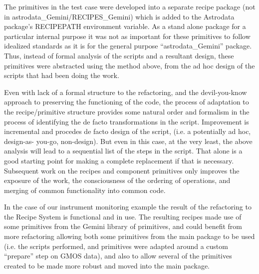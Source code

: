 \documentclass[letterpaper,10pt,english]{sphinxmanual}
\begin{document}
The primitives in the test case were developed into a separate recipe
package (not in astrodata\_Gemini/RECIPES\_Gemini) which is added to the
Astrodata package's RECIPEPATH environment variable. As a stand alone
package for a particular internal purpose it was not as important for
these primitives to follow idealized standards as it is for the
general purpose ``astrodata\_Gemini'' package. Thus, instead of formal
analysis of the scripts and a resultant design, these primitives were
abstracted using the method above, from the ad hoc design of the
scripts that had been doing the work.

Even with lack of a formal structure to the refactoring, and the
devil-you-know approach to preserving the functioning of the code, the
process of adaptation to the recipe/primitive structure provides some
natural order and formalism in the process of identifying the de facto
transformations in the script. Improvement is incremental and procedes
de facto design of the script, (i.e. a potentially ad hoc, design-as-
you-go, non-design). But even in this case, at the very least, the
above analysis will lead to a sequential list of the steps in the
script. That alone is a good starting point for making a complete
replacement if that is necessary. Subsequent work on the recipes and
component primitives only improves the exposure of the work, the
consciousness of the ordering of operations, and merging of common
functionality into common code.

In the case of our instrument monitoring example the result of the
refactoring to the Recipe System is functional and in use. The
resulting recipes made use of some primitives from the Gemini library
of primitives, and could benefit from more refactoring allowing both
some primitives from the main package to be used (i.e. the scripts
performed, and primitives were adapted around a custom ``prepare'' step
on GMOS data), and also to allow several of the primitives created to
be made more robust and moved into the main package.
\end{document}
